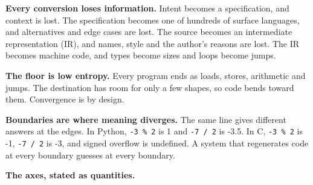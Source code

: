 \documentclass[10pt,letterpaper]{article}
\begin{document}
\textbf{Every conversion loses information.} Intent becomes a
specification, and context is lost. The specification becomes one of
hundreds of surface languages, and alternatives and edge cases are lost.
The source becomes an intermediate representation (IR), and names, style
and the author's reasons are lost. The IR becomes machine code, and
types become sizes and loops become jumps.

\textbf{The floor is low entropy.} Every program ends as loads, stores,
arithmetic and jumps. The destination has room for only a few shapes, so
code bends toward them. Convergence is by design.

\textbf{Boundaries are where meaning diverges.} The same line gives
different answers at the edges. In Python, \texttt{-3\ \%\ 2} is 1 and
\texttt{-7\ /\ 2} is -3.5. In C, \texttt{-3\ \%\ 2} is -1,
\texttt{-7\ /\ 2} is -3, and signed overflow is undefined. A system that
regenerates code at every boundary guesses at every boundary.

\textbf{The axes, stated as quantities.}
\end{document}
